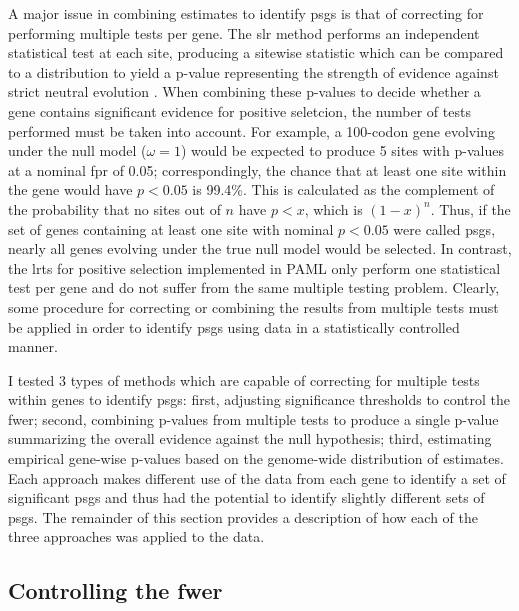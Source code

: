 A major issue in combining \sw estimates to identify \acp{psg} is that
of correcting for performing multiple \sw tests per gene. The \ac{slr}
method performs an independent statistical test at each site,
producing a sitewise statistic which can be compared to a \chisq
distribution to yield a p-value representing the strength of evidence
against strict neutral evolution \citep{Massingham2005}. When
combining these p-values to decide whether a gene contains significant
evidence for positive seletcion, the number of tests performed must be
taken into account. For example, a 100-codon gene evolving under the
null model ($\omega=1$) would be expected to produce 5 sites with
p-values at a nominal \ac{fpr} of 0.05; correspondingly, the chance
that at least one site within the gene would have $p<0.05$ is
99.4\%. This is calculated as the complement of the probability that
no sites out of $n$ have $p<x$, which is $(1-x)^{n}$. Thus, if the set
of genes containing at least one site with nominal $p<0.05$ were
called \acp{psg}, nearly all genes evolving under the true null model
would be selected. In contrast, the \ac{lrt}s for positive selection
implemented in PAML only perform one statistical test per gene and do
not suffer from the same multiple testing problem. Clearly, some
procedure for correcting or combining the results from multiple tests
must be applied in order to identify \acp{psg} using \sw data in a
statistically controlled manner.

I tested 3 types of methods which are capable of correcting for
multiple \sw tests within genes to identify \acp{psg}: first,
adjusting significance thresholds to control the \ac{fwer}; second,
combining p-values from multiple tests to produce a single p-value
summarizing the overall evidence against the null hypothesis; third,
estimating empirical gene-wise p-values based on the genome-wide
distribution of \sw estimates. Each approach makes different use of
the \sw data from each gene to identify a set of significant \acp{psg}
and thus had the potential to identify slightly different sets of
\acp{psg}. The remainder of this section provides a description of how
each of the three approaches was applied to the \sw data.

\subsection{Controlling the \ac{fwer}}

